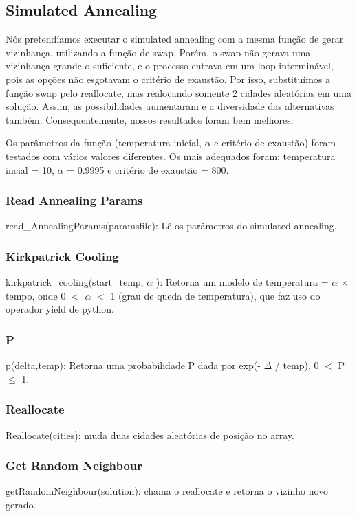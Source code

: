 \documentclass[a4paper,12 pts]{article}
\begin{document}
	\subsection{Simulated Annealing}
		Nós pretendíamos executar o simulated annealing com a mesma função de gerar vizinhança, utilizando a função de swap. Porém, o swap não gerava uma vizinhança grande o suficiente, e o processo entrava em um loop interminável, pois as opções não esgotavam o critério de exaustão. Por isso, substituímos a função swap pelo reallocate, mas realocando somente 2 cidades aleatórias em uma solução. Assim, as possibilidades aumentaram e a diversidade das alternativas também. Consequentemente, nossos resultados foram bem melhores.

		Os parâmetros da função (temperatura inicial, $\alpha$ e critério de exaustão) foram testados com vários valores diferentes. Os mais adequados foram: temperatura incial =  10, $\alpha$ = 0.9995 e critério de exaustão = 800.

		\subsubsection{Read Annealing Params}
			read\_AnnealingParams(paramsfile): Lê os parâmetros do simulated annealing.
		\subsubsection{Kirkpatrick Cooling}
			kirkpatrick\_cooling(start\_temp, $\alpha$ ): Retorna um modelo de temperatura = $\alpha$ $\times$ tempo, onde 0 $<$ $\alpha$ $<$ 1 (grau de queda de temperatura), que faz uso do operador yield de python.
		\subsubsection{P}
			p(delta,temp): Retorna uma probabilidade P dada por exp(- $\Delta$ / temp), 0 $<$ P $\le$ 1.
		\subsubsection{Reallocate}
			Reallocate(cities): muda duas cidades aleatórias de posição no array.
		\subsubsection{Get Random Neighbour}
			getRandomNeighbour(solution): chama o reallocate e retorna o vizinho novo gerado.
\end{document}
